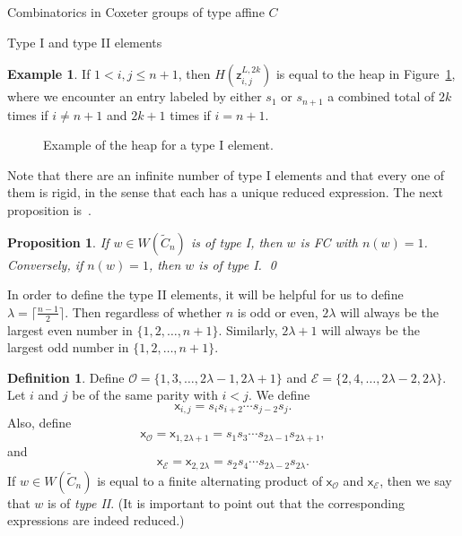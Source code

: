 \documentclass[11pt]{amsart}
\newtheorem{proposition}[theorem]{Proposition}
\theoremstyle{definition}
\newtheorem{definition}[theorem]{Definition}
\newtheorem{example}[theorem]{Example}
\numberwithin{equation}{section}
\newcommand{\C}{\widetilde{C}}
\renewcommand{\O}{\mathcal{O}}
\newcommand{\E}{\mathcal{E}}
\newcommand{\z}{\mathsf{z}}
\newcommand{\x}{\mathsf{x}}
\renewcommand{\(}{\left(}
\renewcommand{\)}{\right)}
\newcommand\xxaxis{0}
\newcommand\yyaxis{90}
\newcommand\heapblock[3]{\fill[draw=black, fill=gray!30, rounded corners, line width=1.1pt, shift={(\xxaxis:#1)},shift={(\yyaxis:#2)}] (-1,-0.5) rectangle (1,0.5);\node at (#1,#2) {$#3$};}
\begin{document}
\begin{section}{Combinatorics in Coxeter groups of type affine $C$}
\begin{subsection}{Type I and type II elements}
\begin{example}
If $1<i,j\leq n+1$, then $H\(\z^{L,2k}_{i,j}\)$ is equal to the heap in Figure~\ref{fig:zigzag}, where we encounter an entry labeled by either $s_{1}$ or $s_{n+1}$ a combined total of $2k$ times if $i\neq n+1$ and $2k+1$ times if $i=n+1$.  
\end{example}

\begin{figure}[!ht]
\caption{Example of the heap for a type I element.}\label{fig:zigzag} 
\end{figure}

Note that there are an infinite number of type I elements and that every one of them is rigid, in the sense that each has a unique reduced expression.   The next proposition is~\cite[Proposition 3.1.3]{Ernst2010}.

\begin{proposition}\label{prop:zigzags}
If $w \in W(\C_{n})$ is of type I, then $w$ is FC with $n(w)=1$.  Conversely, if $n(w)=1$, then $w$ is of type I.  \qed
\end{proposition}

In order to define the type II elements, it will be helpful for us to define $\lambda=\lceil \frac{n-1}{2}\rceil$.  Then regardless of whether $n$ is odd or even, $2\lambda$ will always be the largest even number in $\{1,2,\dots,n+1\}$.  Similarly, $2\lambda+1$ will always be the largest odd number in $\{1,2,\dots, n+1\}$.

\begin{definition}
Define $\O=\{1,3, \dots, 2\lambda-1, 2\lambda+1\}$ and $\E=\{2, 4, \dots, 2\lambda-2, 2\lambda\}$.  Let $i$ and $j$ be of the same parity with $i<j$.  We define 
\[
\x_{i,j}=s_{i}s_{i+2}\cdots s_{j-2}s_{j}.
\]
Also, define
\[
\x_{\O}=\x_{1,2\lambda+1}=s_{1}s_{3}\cdots s_{2\lambda-1}s_{2\lambda+1},
\]
and
\[
\x_{\E}=\x_{2,2\lambda}=s_{2}s_{4}\cdots s_{2\lambda-2}s_{2\lambda}.
\]
If $w \in W(\C_n)$ is equal to a finite alternating product of $\x_{\O}$ and $\x_{\E}$, then we say that $w$ is of \emph{type II}.  (It is important to point out that the corresponding expressions are indeed reduced.)
\end{definition}


\end{subsection}
\end{section}
\end{document}
